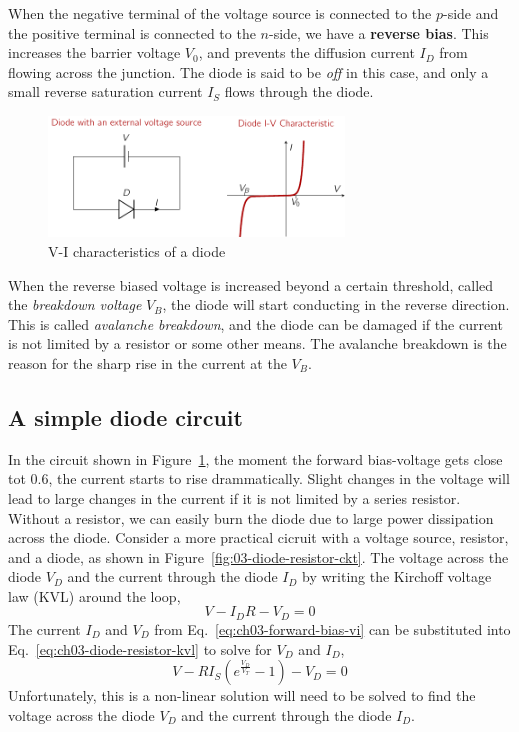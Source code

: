 When the negative terminal of the voltage source is connected to the $p$-side and the positive terminal is connected to the $n$-side, we have a \textbf{reverse bias}. This increases the barrier voltage $V_0$, and prevents the diffusion current $I_D$ from flowing across the junction. The diode is said to be \textit{off} in this case, and only a small reverse saturation current $I_S$ flows through the diode.
\begin{figure}[h]
    \centering
    \includegraphics[width=0.7\textwidth]{figure/ch03/fig03-03.pdf}
    \caption{V-I characteristics of a diode}
    \label{fig:03-diode-vi}
\end{figure}
When the reverse biased voltage is increased beyond a certain threshold, called the \textit{breakdown voltage} $V_B$, the diode will start conducting in the reverse direction. This is called \textit{avalanche breakdown}, and the diode can be damaged if the current is not limited by a resistor or some other means. The avalanche breakdown is the reason for the sharp rise in the current at the $V_B$.

\subsection{A simple diode circuit}
In the circuit shown in Figure~\ref{fig:03-diode-vi}, the moment the forward bias-voltage gets close tot 0.6, the current starts to rise drammatically. Slight changes in the voltage will lead to large changes in the current if it is not limited by a series resistor. Without a resistor, we can easily burn the diode due to large power dissipation across the diode. Consider a more practical cicruit with a voltage source, resistor, and a diode, as shown in Figure~\ref{fig:03-diode-resistor-ckt}. The voltage across the diode $V_D$ and the current through the diode $I_D$ by writing the Kirchoff voltage law (KVL) around the loop,
\begin{equation}
    V - I_D R - V_D = 0
    \label{eq:ch03-diode-resistor-kvl}
\end{equation}
The current $I_D$ and $V_D$ from Eq.~\ref{eq:ch03-forward-bias-vi} can be substituted into Eq.~\ref{eq:ch03-diode-resistor-kvl} to solve for $V_D$ and $I_D$,
\begin{equation}
    V - R I_S \left( e^{\frac{V_D}{V_T}} - 1 \right) - V_D = 0
    \label{eq:ch03-diode-resistor-vd-id}
\end{equation}
Unfortunately, this is a non-linear solution will need to be solved to find the voltage across the diode $V_D$ and the current through the diode $I_D$. 

